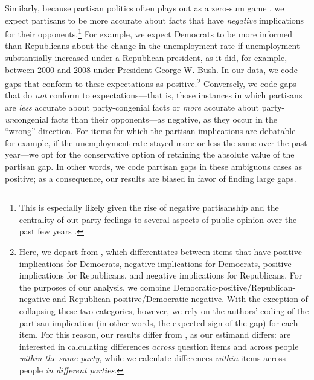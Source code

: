 \documentclass[12pt, letterpaper]{article}
\begin{document}
Similarly, because partisan politics often plays out as a zero-sum game \citep[e.g.,][]{lee_2016}, we expect partisans to be more accurate about facts that have \textit{negative} implications for their opponents.\footnote{This is especially likely given the rise of negative partisanship and the centrality of out-party feelings to several aspects of public opinion over the past few years \citep[e.g.,][]{abramowitzwebster_2016,hetheringtonrudolph_2015,IyengarSoodLelkes2012,mason_2018,nicholson_2012}.} For example, we expect Democrats to be more informed than Republicans about the change in the unemployment rate if unemployment substantially increased under a Republican president, as it did, for example, between 2000 and 2008 under President George W. Bush. In our data, we code gaps that conform to these expectations as positive.\footnote{Here, we depart from \citet{jerit2012partisan}, which differentiates between items that have positive implications for Democrats, negative implications for Democrats, positive implications for Republicans, and negative implications for Republicans. For the purposes of our analysis, we combine Democratic-positive/Republican-negative and Republican-positive/Democratic-negative. With the exception of collapsing these two categories, however, we rely on the authors' coding of the partisan implication (in other words, the expected sign of the gap) for each item. For this reason, our results differ from \citet{jerit2012partisan}, as our estimand differs: \citet{jerit2012partisan} are interested in calculating differences \textit{across} question items and across people \textit{within the same party}, while we calculate differences \textit{within} items across people \textit{in different parties}.} Conversely, we code gaps that do \textit{not} conform to expectations---that is, those instances in which partisans are \textit{less} accurate about party-congenial facts or \textit{more} accurate about party-\textit{un}congenial facts than their opponents---as negative, as they occur in the ``wrong'' direction. For items for which the partisan implications are debatable---for example, if the unemployment rate stayed more or less the same over the past year---we opt for the conservative option of retaining the absolute value of the partisan gap. In other words, we code partisan gaps in these ambiguous cases as positive; as a consequence, our results are biased in favor of finding large gaps. 
\end{document}

